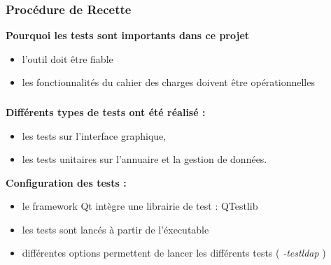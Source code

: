 \begin{frame}
\frametitle{Procédure de Recette}
\begin{block}{\textbf{Pourquoi les tests sont importants dans ce projet}}
\begin{itemize}
\item l'outil doit être fiable
\item les fonctionnalités du cahier des charges doivent être opérationnelles
\end{itemize}
\end{block}
\end{frame}

\begin{frame}
\frametitle{}
\begin{block}{\textbf{Différents types de tests ont été réalisé : }}
\begin{itemize}
\item les tests sur l'interface graphique,
\item les tests unitaires sur l'annuaire et la gestion de données.
\end{itemize}
\end{block}
\begin{block}{\textbf{Configuration des tests : }}
\begin{itemize}
\item le framework Qt intègre une librairie de test : QTestlib
\item les tests sont lancés à partir de l'éxecutable
\item différentes options permettent de lancer les différents tests ( \emph{-testldap} )
\end{itemize}
\end{block}
\end{frame}


